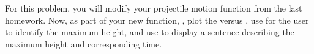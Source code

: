 {For this problem, you will modify your projectile motion function from the last homework.  Now, as part of your new function, , plot the  versus , use  for the user to identify the maximum height, and use  to display a sentence describing the maximum height and corresponding time.    }
{}
